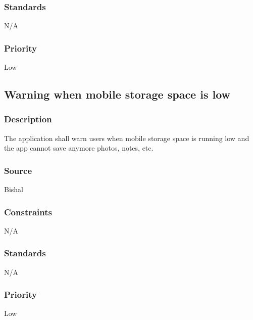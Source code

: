 \subsubsection{Standards}
N/A
\subsubsection{Priority}
Low

\subsection{Warning when mobile storage space is low}
\subsubsection{Description}
The application shall warn users when mobile storage space is running low and the app cannot save anymore photos, notes, etc.
\subsubsection{Source}
Bishal
\subsubsection{Constraints}
N/A
\subsubsection{Standards}
N/A
\subsubsection{Priority}
Low